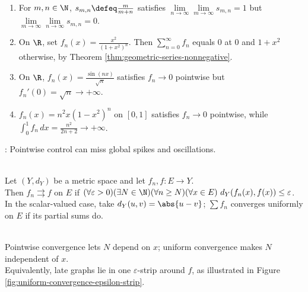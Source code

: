 \begin{example} \label{ex:pointwise-limits-do-not-preserve-structure} 
\begin{enumerate}[label=(\roman*)]
\setlength{\itemsep}{0pt}
\item For $m,n\in\N$, $s_{m,n}\defeq\frac{m}{m+n}$ satisfies $\lim\limits_{n\to\infty}\lim\limits_{m\to\infty}s_{m,n}=1$ but $\lim\limits_{m\to\infty}\lim\limits_{n\to\infty}s_{m,n}=0$.
\item On $\R$, set $f_n(x)=\frac{x^2}{(1+x^2)^n}$. Then $\sum\limits_{n=0}^{\infty}f_n$ equals $0$ at $0$ and $1+x^2$ otherwise, by Theorem \ref{thm:geometric-series-nonnegative}.
\item On $\R$, $f_n(x)=\frac{\sin(nx)}{\sqrt n}$ satisfies $f_n\to0$ pointwise but $f_n'(0)=\sqrt n\to+\infty$.
\item $f_n(x)=n^2x(1-x^2)^n$ on $[0,1]$ satisfies $f_n\to0$ pointwise, while $\int_0^1 f_n\,dx=\frac{n^2}{2n+2}\to+\infty$.
\end{enumerate}
: Pointwise control can miss global spikes and oscillations.
\end{example}

\begin{definition} \label{def:uniform-convergence-functions} \\
Let $(Y,d_Y)$ be a metric space and let $f_n,f:E\to Y$.\\
Then $f_n\rightrightarrows f$ on $E$ if $(\forall\varepsilon>0)(\exists N\in\N)(\forall n\geq N)(\forall x\in E)\ d_Y(f_n(x),f(x))\leq\varepsilon$.\\
In the scalar-valued case, take $d_Y(u,v)=\abs{u-v}$; $\sum f_n$ converges uniformly on $E$ if its partial sums do.
\end{definition}

\begin{perspective} \label{per:uniform-convergence-epsilon-strip} \\
Pointwise convergence lets $N$ depend on $x$; uniform convergence makes $N$ independent of $x$.\\
Equivalently, late graphs lie in one $\varepsilon$-strip around $f$, as illustrated in Figure \ref{fig:uniform-convergence-epsilon-strip}.
\end{perspective}

\begin{illustrationfigure}[H]
  \centering
  
  \caption{One index $N$ puts all later graphs inside the same $\varepsilon$-strip around $f$ on $E$.}
  \label{fig:uniform-convergence-epsilon-strip}
\end{illustrationfigure}

